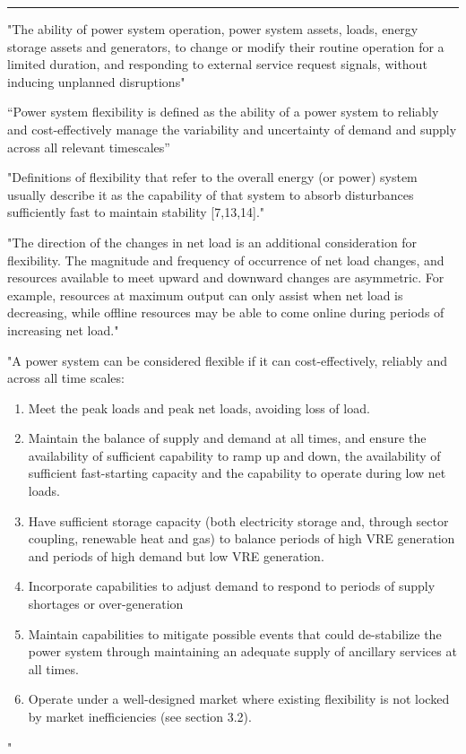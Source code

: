 \hrule

"The ability of power system operation, power system assets, loads, energy storage assets and generators, to change or modify their routine operation for a limited duration, and responding to external service request signals, without inducing unplanned disruptions" \cite{degefa_comprehensive_2021}

“Power system flexibility is defined as the ability of a power system to reliably and cost-effectively manage the variability and uncertainty of demand and supply across all relevant timescales”
\cite{international_energy_agency_status_2017}

"Definitions of flexibility that refer to the overall energy (or power) system usually describe it as the capability of that system to absorb disturbances sufficiently fast to maintain stability [7,13,14]." \cite{lechl_review_2023}

"The direction of the changes in net load is an additional consideration for flexibility. The magnitude and frequency of occurrence of net load changes, and resources available to meet upward and downward changes are asymmetric. For example, resources at maximum output can only assist when net load is decreasing, while offline resources may be able to come online during periods of increasing net load." \cite{eamonn_lannoye_evaluation_2012}

"A power system can be considered flexible if it can cost-effectively, reliably and across all time scales:
\begin{enumerate}
    \item Meet the peak loads and peak net loads, avoiding loss of load.
    \item Maintain the balance of supply and demand at all times, and ensure the availability of sufficient capability to ramp up and down, the availability of sufficient fast-starting capacity and the capability to operate during low net loads.
    \item Have sufficient storage capacity (both electricity storage and, through sector coupling, renewable heat and gas) to balance periods of high VRE generation and periods of high demand but low VRE generation.
    \item Incorporate capabilities to adjust demand to respond to periods of supply shortages or over-generation
    \item Maintain capabilities to mitigate possible events that could de-stabilize the power system through maintaining an adequate supply of ancillary services at all times.
    \item Operate under a well-designed market where existing flexibility is not locked by market inefficiencies (see section 3.2).
\end{enumerate}
" \cite{emanuele_taibi_power_2018}

